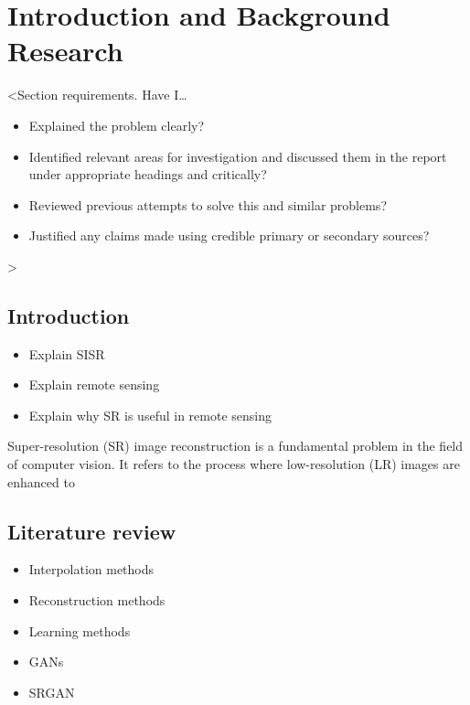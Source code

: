 \chapter{Introduction and Background Research}

\label{chapter1}

<Section requirements. Have I\dots
\begin{itemize}
    \item Explained the problem clearly?
    \item Identified relevant areas for investigation and discussed them in the report under appropriate headings and critically?
    \item Reviewed previous attempts to solve this and similar problems?
    \item Justified any claims made using credible primary or secondary sources?
\end{itemize}
>

\section{Introduction}

\begin{itemize}
    \item Explain SISR
    \item Explain remote sensing
    \item Explain why SR is useful in remote sensing
\end{itemize}

Super-resolution (SR) image reconstruction is a fundamental problem in the field of computer vision. It refers to the process where low-resolution (LR) images are enhanced to 

\section{Literature review}

\begin{itemize}
    \item Interpolation methods
    \item Reconstruction methods
    \item Learning methods
    \item GANs
    \item SRGAN
\end{itemize}